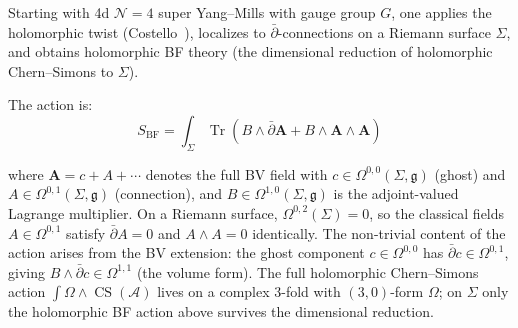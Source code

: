 \begin{theorem}[HT theory from 4d \texorpdfstring{$\mathcal{N}=4$}{N=4} SYM; \ClaimStatusProvedElsewhere]
\label{thm:ht-from-n4-sym}
Starting with 4d $\mathcal{N}=4$ super Yang--Mills with gauge group $G$, one applies the holomorphic twist (Costello~\cite{costello-gaiotto}), localizes to $\bar{\partial}$-connections on a Riemann surface $\Sigma$, and obtains holomorphic BF theory (the dimensional reduction of holomorphic Chern--Simons to $\Sigma$).

The action is:
\[S_{\text{BF}} = \int_{\Sigma} \operatorname{Tr}\!\left(B \wedge \bar{\partial} \mathbf{A} + B \wedge \mathbf{A} \wedge \mathbf{A}\right)\]

where $\mathbf{A} = c + A + \cdots$ denotes the full BV field with $c \in \Omega^{0,0}(\Sigma, \mathfrak{g})$ (ghost) and $A \in \Omega^{0,1}(\Sigma, \mathfrak{g})$ (connection), and $B \in \Omega^{1,0}(\Sigma, \mathfrak{g})$ is the adjoint-valued Lagrange multiplier.
On a Riemann surface, $\Omega^{0,2}(\Sigma) = 0$, so the classical fields
$A \in \Omega^{0,1}$ satisfy $\bar{\partial}A = 0$ and $A \wedge A = 0$ identically.  The non-trivial
content of the action arises from the BV extension: the ghost component $c \in \Omega^{0,0}$ has
$\bar{\partial}c \in \Omega^{0,1}$, giving $B \wedge \bar{\partial}c \in \Omega^{1,1}$ (the volume form).
The full holomorphic Chern--Simons action $\int \Omega \wedge \operatorname{CS}(\mathcal{A})$ lives on a
complex $3$-fold with $(3,0)$-form $\Omega$; on $\Sigma$ only the holomorphic BF action above survives the dimensional reduction.
\end{theorem}

